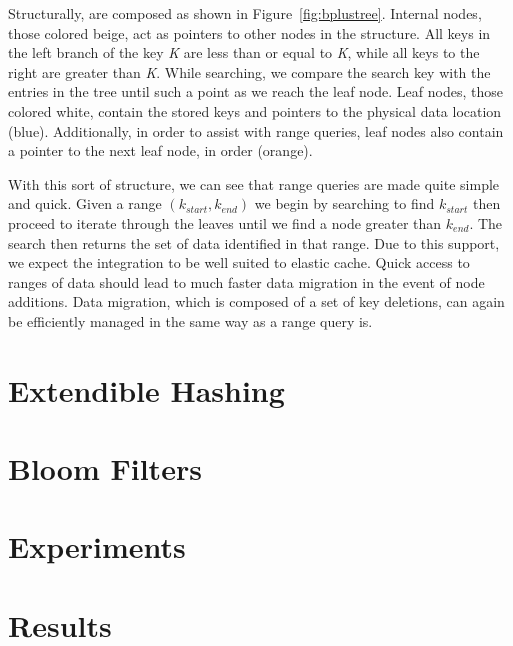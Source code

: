 Structurally, \bptrees are composed as shown in Figure~\ref{fig:bplustree}.
Internal nodes, those colored beige, act as pointers to other nodes in the
structure. All keys in the left branch of the key \emph{K} are less than or
equal to \emph{K}, while all keys to the right are greater than \emph{K}. While
searching, we compare the search key with the entries in the tree until such a
point as we reach the leaf node. Leaf nodes, those colored white, contain the
stored keys and pointers to the physical data location (blue). Additionally, in
order to assist with range queries, leaf nodes also contain a pointer to the
next leaf node, in order (orange).

With this sort of structure, we can see that range queries are made quite
simple and quick. Given a range $(k_{start}, k_{end})$ we begin by searching to
find $k_{start}$ then proceed to iterate through the leaves until we find a
node greater than $k_{end}$. The search then returns the set of data identified
in that range. Due to this support, we expect the \bptree integration to be
well suited to elastic cache. Quick access to ranges of data should lead to
much faster data migration in the event of node additions. Data migration,
which is composed of a set of key deletions, can again be efficiently managed
in the same way as a range query is.



\section{Extendible Hashing} %
\label{sec:extendible_hashing}


\section{Bloom Filters} %
\label{sec:bloom_filters}


\section{Experiments} %
\label{sec:experiments_indexing}


\section{Results} %
\label{sec:results_indexing}

